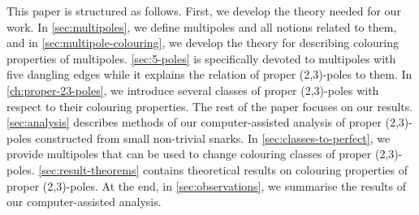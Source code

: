 


This paper is structured as follows. First, we develop the theory needed for our work. In \cref{sec:multipoles}, we define multipoles and all notions related to them, and in \cref{sec:multipole-colouring}, we develop the theory for describing colouring properties of multipoles. \cref{sec:5-poles} is specifically devoted to multipoles with five dangling edges while it explains the relation of proper (2,3)-poles to them. In \cref{ch:proper-23-poles}, we introduce several classes of proper (2,3)-poles with respect to their colouring properties. The rest of the paper focuses on our results. \cref{sec:analysis} describes methods of our computer-assisted analysis of proper (2,3)-poles constructed from small non-trivial snarks. In \cref{sec:classes-to-perfect}, we provide multipoles that can be used to change colouring classes of proper (2,3)-poles. \cref{sec:result-theorems} contains theoretical results on colouring properties of proper (2,3)-poles. At the end, in \cref{sec:observations}, we summarise the results of our computer-assisted analysis.

